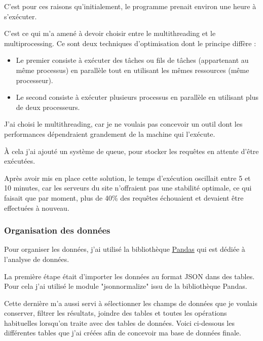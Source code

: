 C'est pour ces raisons qu'initialement, le programme prenait environ une heure à s'exécuter.

C'est ce qui m'a amené à devoir choisir entre le multithreading et le multiprocessing. Ce sont deux techniques d'optimisation dont le principe diffère :
\begin{itemize}
\item Le premier consiste à exécuter des tâches ou fils de tâches (appartenant au même processus) en parallèle tout en utilisant les mêmes ressources (même processeur).
\item Le second consiste à exécuter plusieurs processus en parallèle en utilisant plus de deux processeurs.
\end{itemize}

J'ai choisi le multithreading, car je ne voulais pas concevoir un outil dont les performances dépendraient grandement de la machine qui l'exécute.

À cela j'ai ajouté un système de queue, pour stocker les requêtes en attente d'être exécutées.

Après avoir mis en place cette solution, le temps d'exécution oscillait entre 5 et 10 minutes, car les serveurs du site n'offraient pas une stabilité optimale, ce qui faisait que par moment, plus de 40\% des requêtes échouaient et devaient être effectuées à nouveau.

\subsubsection{Organisation des données}

Pour organiser les données, j'ai utilisé la bibliothèque \underline{\href{https://pandas.pydata.org}{Pandas}} qui est dédiée à l'analyse de données.

La première étape était d'importer les données au format JSON dans des tables. Pour cela j'ai utilisé le module "jsonnormalize" issu de la bibliothèque Pandas.

Cette dernière m'a aussi servi à sélectionner les champs de données que je voulais conserver, filtrer les résultats, joindre des tables et toutes les opérations habituelles lorsqu'on traite avec des tables de données.
Voici ci-dessous les différentes tables que j'ai créées afin de concevoir ma base de données finale.

